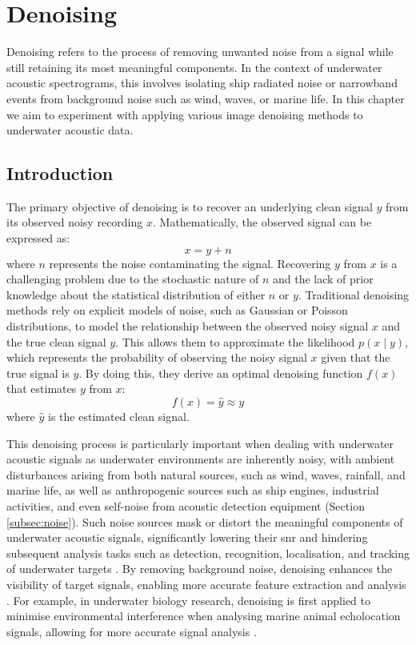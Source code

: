 \chapter{Denoising}

Denoising refers to the process of removing unwanted noise from a signal while still retaining its most meaningful components. In the context of underwater acoustic spectrograms, this involves isolating ship radiated noise or narrowband events from background noise such as wind, waves, or marine life. In this chapter we aim to experiment with applying various image denoising methods to underwater acoustic data.

\section{Introduction}

The primary objective of denoising is to recover an underlying clean signal $y$ from its observed noisy recording $x$. Mathematically, the observed signal can be expressed as:
\begin{equation}
    x = y + n
\end{equation}
where $n$ represents the noise contaminating the signal. Recovering $y$ from $x$ is a challenging problem due to the stochastic nature of $n$ and the lack of prior knowledge about the statistical distribution of either $n$ or $y$. Traditional denoising methods rely on explicit models of noise, such as Gaussian or Poisson distributions, to model the relationship between the observed noisy signal $x$ and the true clean signal $y$. This allows them to approximate the likelihood $p(x \mid y)$, which represents the probability of observing the noisy signal $x$ given that the true signal is $y$. By doing this, they derive an optimal denoising function $f(x)$ that estimates $y$ from $x$:
\begin{equation}
    f(x) = \hat{y} \approx y
\end{equation}
where $\hat{y}$ is the estimated clean signal. 

This denoising process is particularly important when dealing with underwater acoustic signals as underwater environments are inherently noisy, with ambient disturbances arising from both natural sources, such as wind, waves, rainfall, and marine life, as well as anthropogenic sources such as ship engines, industrial activities, and even self-noise from acoustic detection equipment (Section \ref{subsec:noise}). Such noise sources mask or distort the meaningful components of underwater acoustic signals, significantly lowering their \acrlong{snr} and hindering subsequent analysis tasks such as detection, recognition, localisation, and tracking of underwater targets \cite{wang_stacked_2020, dong_bidirectional_2022, pauline_low-complexity_2022}. By removing background noise, denoising enhances the visibility of target signals, enabling more accurate feature extraction and analysis \cite{yin_research_2023, zhou_dbsa-net_2023, song_method_2024}. For example, in underwater biology research, denoising is first applied to minimise environmental interference when analysing marine animal echolocation signals, allowing for more accurate signal analysis \cite{yang_transfer_2021}.


